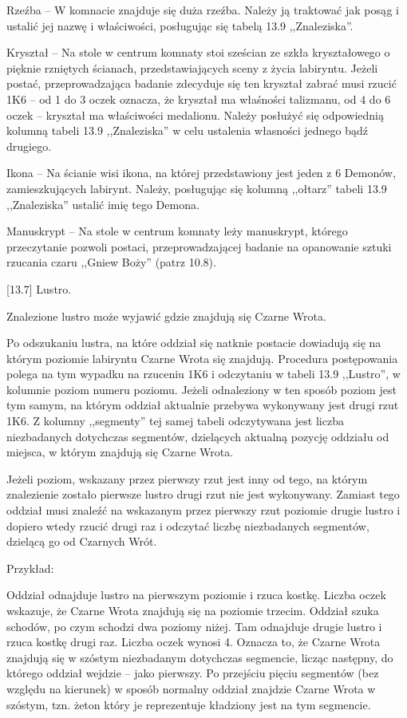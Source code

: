 Rzeźba – W komnacie znajduje się duża rzeźba.
Należy ją traktować jak posąg i ustalić jej nazwę i właściwości, posługując się tabelą 13.9 ,,Znaleziska''.

Kryształ – Na stole w centrum komnaty stoi sześcian ze szkła kryształowego o pięknie rzniętych ścianach, przedstawiających sceny z życia labiryntu.
Jeżeli postać, przeprowadzająca badanie zdecyduje się ten kryształ zabrać musi rzucić 1K6 – od 1 do 3 oczek oznacza, że kryształ ma właśności talizmanu, od 4 do 6 oczek – kryształ ma właściwości medalionu.
Należy posłużyć się odpowiednią kolumną tabeli 13.9 ,,Znaleziska'' w celu ustalenia własności jednego bądź drugiego.

Ikona – Na ścianie wisi ikona, na której przedstawiony jest jeden z 6 Demonów, zamieszkujących labirynt.
Należy, posługując się kolumną ,,ołtarz'' tabeli 13.9 ,,Znaleziska'' ustalić imię tego Demona.

Manuskrypt – Na stole w centrum komnaty leży manuskrypt, którego przeczytanie pozwoli postaci, przeprowadzającej badanie na opanowanie sztuki rzucania czaru ,,Gniew Boży'' (patrz 10.8).

[13.7] Lustro.

Znalezione lustro może wyjawić gdzie znajdują się Czarne Wrota.

Po odszukaniu lustra, na które oddział się natknie postacie dowiadują się na którym poziomie labiryntu Czarne Wrota się znajdują.
Procedura postępowania polega na tym wypadku na rzuceniu 1K6 i odczytaniu w tabeli 13.9 ,,Lustro'', w kolumnie poziom numeru poziomu.
Jeżeli odnaleziony w ten sposób poziom jest tym samym, na którym oddział aktualnie przebywa wykonywany jest drugi rzut 1K6.
Z kolumny ,,segmenty'' tej samej tabeli odczytywana jest liczba niezbadanych dotychczas segmentów, dzielących aktualną pozycję oddziału od miejsca, w którym znajdują się Czarne Wrota.

Jeżeli poziom, wskazany przez pierwszy rzut jest inny od tego, na którym znalezienie zostało pierwsze lustro drugi rzut nie jest wykonywany.
Zamiast tego oddział musi znaleźć na wskazanym przez pierwszy rzut poziomie drugie lustro i dopiero wtedy rzucić drugi raz i odczytać liczbę niezbadanych segmentów, dzielącą go od Czarnych Wrót.

Przykład:

Oddział odnajduje lustro na pierwszym poziomie i rzuca kostkę.
Liczba oczek wskazuje, że Czarne Wrota znajdują się na poziomie trzecim.
Oddział szuka schodów, po czym schodzi dwa poziomy niżej.
Tam odnajduje drugie lustro i rzuca kostkę drugi raz.
Liczba oczek wynosi 4.
Oznacza to, że Czarne Wrota znajdują się w szóstym niezbadanym dotychczas segmencie, licząc następny, do którego oddział wejdzie – jako pierwszy.
Po przejściu pięciu segmentów (bez względu na kierunek) w sposób normalny oddział znajdzie Czarne Wrota w szóstym, tzn. żeton który je reprezentuje kładziony jest na tym segmencie.

